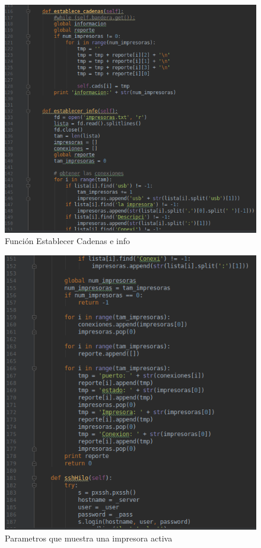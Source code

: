\FloatBarrier
\begin{figure}[htbp!]
		\centering
			\includegraphics[width=.9\textwidth]{images/s4}
		\caption{Función Establecer Cadenas e info }
		\label{image:s4}
\end{figure}
\FloatBarrier

\FloatBarrier
\begin{figure}[htbp!]
		\centering
			\includegraphics[width=.9\textwidth]{images/s5}
		\caption{Parametros que muestra una impresora activa}
		\label{image:s5}
\end{figure}
\FloatBarrier

